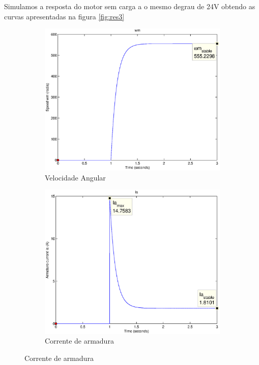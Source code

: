 \documentclass{article}
\begin{document}
Simulamos a resposta do motor sem carga a o mesmo degrau de 24V obtendo as curvas apresentadas na figura \ref{fig:res3}

\begin{figure}[H]
	\centering
	\begin{subfigure}[b]{0.49\linewidth}
		\includegraphics[width=\linewidth]{matlab/wm3}
		\caption{Velocidade Angular}
	\end{subfigure}
	\begin{subfigure}[b]{0.49\linewidth}
		\centering
		\includegraphics[width=\linewidth]{matlab/ia3}
		\caption{Corrente de armadura}

\end{subfigure}
\end{figure}
\end{document}
